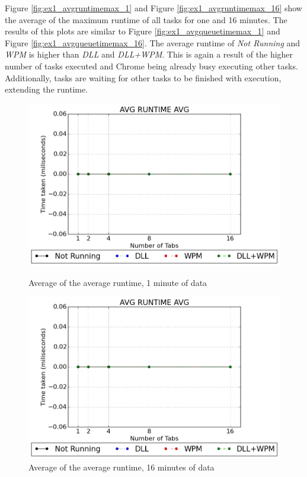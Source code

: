 Figure \ref{fig:ex1_avgruntimemax_1} and Figure \ref{fig:ex1_avgruntimemax_16} show the average of the maximum runtime of all tasks for one and 16 minutes. The results of this plots are similar to Figure \ref{fig:ex1_avgqueuetimemax_1} and Figure \ref{fig:ex1_avgqueuetimemax_16}. The average runtime of \emph{Not Running} and \emph{\gls{WPM}} is higher than \emph{\gls{DLL}} and \emph{\gls{DLL}+\gls{WPM}}. This is again a result of the higher number of tasks executed and Chrome being already busy executing other tasks. Additionally, tasks are waiting for other tasks to be finished with execution, extending the runtime.
\begin{figure}[!htbp]
	\centering
    \includegraphics[width=\textwidth,height=0.45\textheight,keepaspectratio]{Evaluation/experiment1/AVG-RUNTIME-AVG-1.png}
    \caption{Average of the average runtime, 1 minute of data}
    \label{fig:ex1_avgruntimeavg_1}
    
  	\vspace*{\floatsep}    
    
    \includegraphics[width=\textwidth,height=0.45\textheight,keepaspectratio]{Evaluation/experiment1/AVG-RUNTIME-AVG-16.png}
    \caption{Average of the average runtime, 16 minutes of data}
    \label{fig:ex1_avgruntimeavg_16}
\end{figure}
